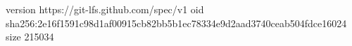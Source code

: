 version https://git-lfs.github.com/spec/v1
oid sha256:2e16f1591c98d1af00915cb82bb5b1ec78334e9d2aad3740ceab504fdce16024
size 215034
